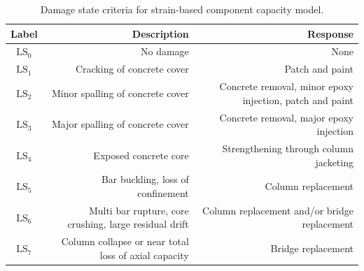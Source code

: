 \begin{table}[H]
\centering
\caption{Damage state criteria for strain-based component capacity model.}
\label{tab:DS-Labels}
\begin{tabular}{@{}cNN@{}}
\toprule
\textbf{Label} & \textbf{Description} & \textbf{Response} 
\\ \midrule
$\mathrm{LS}_0$ & No damage & None  \\
$\mathrm{LS}_1$ & Cracking of concrete cover & Patch and paint   \\
$\mathrm{LS}_2$ & Minor spalling of concrete  cover & Concrete removal, minor epoxy injection, patch and paint   \\
$\mathrm{LS}_3$ & Major spalling of concrete cover %
& Concrete removal, major epoxy injection  \\
$\mathrm{LS}_4$ & Exposed concrete core  & Strengthening through column jacketing \\
$\mathrm{LS}_5$ & Bar buckling, loss of confinement %
& Column replacement   \\
$\mathrm{LS}_6$ & Multi bar rupture, core  crushing, large residual drift & Column replacement and/or bridge replacement  \\
$\mathrm{LS}_7$ &  Column collapse or near total loss of axial capacity & Bridge replacement \\
\bottomrule
\end{tabular}
\end{table}

